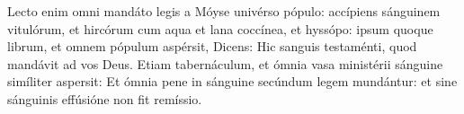 
Lecto enim omni mandáto legis a Móyse univérso pópulo: accípiens sánguinem vitulórum, et hircórum cum aqua et lana coccínea, et hyssópo: ipsum quoque librum, et omnem pópulum aspérsit,
Dicens: Hic sanguis testaménti, quod mandávit ad vos Deus.
Etiam tabernáculum, et ómnia vasa ministérii sánguine simíliter aspersit:
Et ómnia pene in sánguine secúndum legem mundántur: et sine sánguinis effúsióne non fit remíssio.
\par